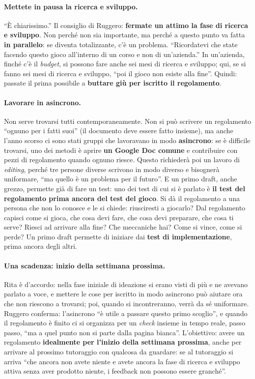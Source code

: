 \paragraph{Mettete in pausa la ricerca e sviluppo.} ``È chiarissimo.'' Il consiglio di
Ruggero: \textbf{fermate un attimo la fase di ricerca e sviluppo}. Non perché non sia
importante, ma perché a questo punto va fatta \textbf{in parallelo}: se diventa
totalizzante, c'è un problema. ``Ricordatevi che state facendo questo gioco all'interno
di un corso e non di un'azienda.'' In un'azienda, finché c'è il \emph{budget}, si possono
fare anche sei mesi di ricerca e sviluppo; qui, se si fanno sei mesi di ricerca e
sviluppo, ``poi il gioco non esiste alla fine''. Quindi: passate il prima possibile a
\textbf{buttare giù per iscritto il regolamento}.

\paragraph{Lavorare in asincrono.} Non serve trovarsi tutti contemporaneamente. Non si
può scrivere un regolamento ``ognuno per i fatti suoi'' (il documento deve essere fatto
insieme), ma anche l'anno scorso ci sono stati gruppi che lavoravano in modo
\textbf{asincrono}: se è difficile trovarsi, uno dei metodi è aprire \textbf{un Google
Doc comune} e contribuire con pezzi di regolamento quando ognuno riesce. Questo richiederà
poi un lavoro di \emph{editing}, perché tre persone diverse scrivono in modo diverso e
bisognerà uniformare, ``ma quello è un problema per il futuro''. E un primo draft, anche
grezzo, permette già di fare un test: uno dei test di cui si è parlato è \textbf{il test
del regolamento prima ancora del test del gioco}. Si dà il regolamento a una persona che
non lo conosce e le si chiede: riusciresti a giocarlo? Dal regolamento capisci come si
gioca, che cosa devi fare, che cosa devi preparare, che cosa ti serve? Riesci ad arrivare
alla fine? Che meccaniche hai? Come si vince, come si perde? Un primo draft permette di
iniziare dai \textbf{test di implementazione}, prima ancora degli altri.

\paragraph{Una scadenza: inizio della settimana prossima.} Rita è d'accordo: nella fase
iniziale di ideazione si erano visti di più e ne avevano parlato a voce, e mettere le cose
per iscritto in modo asincrono può aiutare ora che non riescono a trovarsi; poi, quando
si incontreranno, verrà da sé uniformare. Ruggero conferma: l'asincrono ``è utile a
passare questo primo scoglio'', e quando il regolamento è finito ci si organizza per un
\emph{check} insieme in tempo reale, passo passo, ``ma a quel punto non si parte dalla
pagina bianca''. L'obiettivo: avere un regolamento \textbf{idealmente per l'inizio della
settimana prossima}, anche per arrivare al prossimo tutoraggio con qualcosa da guardare:
se al tutoraggio si arriva ``che ancora non avete niente e avete ancora la fase di
ricerca e sviluppo attiva senza aver prodotto niente, i feedback non possono essere
granché''.

